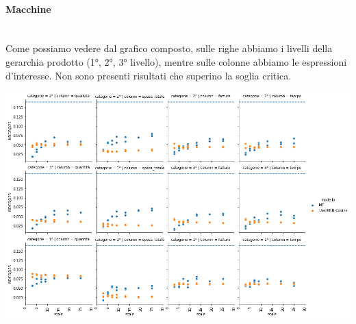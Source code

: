 \paragraph{Macchine}\mbox{} \\
Come possiamo vedere dal grafico composto, sulle righe abbiamo i livelli della gerarchia prodotto (1°, 2°, 3° livello), mentre sulle colonne abbiamo le espressioni d'interesse. 
Non sono presenti risultati che superino la soglia critica.
\begin{center}
\includegraphics[width=15cm]{figures/risultati_minmax_categoria_macchine.png}
\label{tab:minmax_macchine}
\end{center}
\newpage

